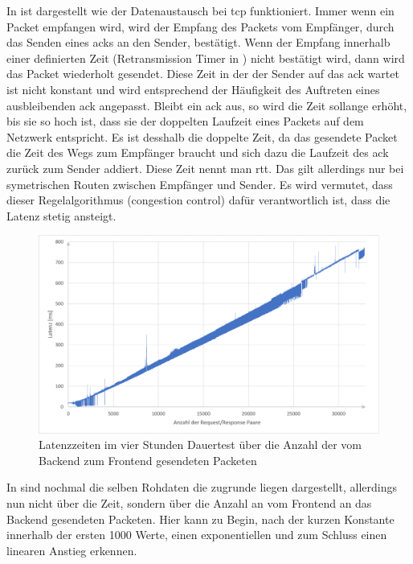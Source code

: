 In  ist dargestellt wie der Datenaustausch bei tcp funktioniert.
Immer wenn ein Packet empfangen wird, wird der Empfang des Packets vom Empfänger, durch das Senden eines \acp{ack} an den Sender, bestätigt.
Wenn der Empfang innerhalb einer definierten Zeit (Retransmission Timer in ) nicht bestätigt wird, 
dann wird das Packet wiederholt gesendet.
Diese Zeit in der der Sender auf das \ac{ack} wartet ist nicht konstant und wird entsprechend der Häufigkeit des Auftreten eines ausbleibenden \ac{ack} angepasst.
Bleibt ein \ac{ack} aus, so wird die Zeit sollange erhöht, bis sie so hoch ist, dass sie der doppelten Laufzeit eines Packets auf dem Netzwerk entspricht.
Es ist desshalb die doppelte Zeit, da das gesendete Packet die Zeit des Wegs zum Empfänger braucht und sich dazu die Laufzeit des \ac{ack} zurück zum Sender addiert. Diese Zeit nennt man \ac{rtt}.
Das gilt allerdings nur bei symetrischen Routen zwischen Empfänger und Sender.
Es wird vermutet, dass dieser Regelalgorithmus (congestion control) dafür verantwortlich ist, dass die Latenz stetig ansteigt.
\begin{figure}[ht]
  \centering
  \includegraphics[width=\textwidth]{content/hauptteil/umsetzungPoC/pocTest/res/LatenzNormal4hReqRes.pdf}
  \caption{Latenzzeiten im vier Stunden Dauertest über die Anzahl der vom Backend zum Frontend gesendeten Packeten}
  \label{fig:testing:latency4hNorm:cnt}
\end{figure}
In  sind nochmal die selben Rohdaten die  zugrunde liegen dargestellt, 
allerdings nun nicht über die Zeit, 
sondern über die Anzahl an vom Frontend an das Backend gesendeten Packeten. 
Hier kann zu Begin, nach der kurzen Konstante innerhalb der ersten 1000 Werte, einen exponentiellen und zum Schluss einen linearen Anstieg erkennen.
